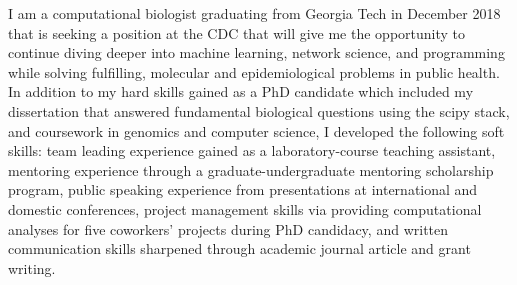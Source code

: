 

\begin{cventries}


\fontsize{10pt}{1em}\bodyfontlight\upshape\color{black}\justify
I am a computational biologist graduating from Georgia Tech in December 2018 that is seeking a position at the CDC that will give me the opportunity to continue diving deeper into machine learning, network science, and programming while solving fulfilling, molecular and epidemiological problems in public health. In addition to my hard skills gained as a PhD candidate which included my dissertation that answered fundamental biological questions using the scipy stack, and coursework in genomics and computer science, I developed the following soft skills: team leading experience gained as a laboratory-course teaching assistant, mentoring experience through a graduate-undergraduate mentoring scholarship program, public speaking experience from presentations at international and domestic conferences, project management skills via providing computational analyses for five coworkers' projects during PhD candidacy, and written communication skills sharpened through academic journal article and grant writing.
    
\vspace{-2.0mm}
\end{cventries}
